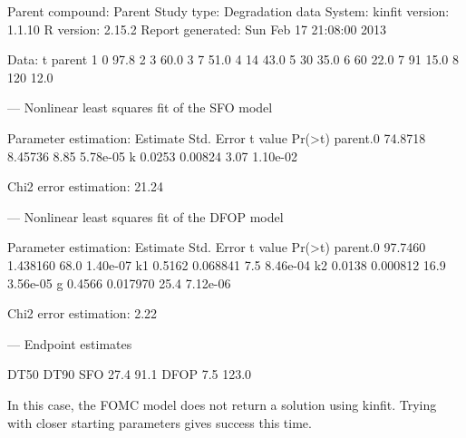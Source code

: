 \documentclass[12pt,a4paper]{article}
\begin{document}
\begin{Schunk}
\begin{Soutput}
Parent compound:  Parent 
Study type:       Degradation data 
System:            
kinfit version:   1.1.10 
R version:        2.15.2 
Report generated: Sun Feb 17 21:08:00 2013 

Data:
    t parent
1   0   97.8
2   3   60.0
3   7   51.0
4  14   43.0
5  30   35.0
6  60   22.0
7  91   15.0
8 120   12.0



---
Nonlinear least squares fit of the SFO model

Parameter estimation:	
         Estimate Std. Error t value   Pr(>t)
parent.0  74.8718    8.45736    8.85 5.78e-05
k          0.0253    0.00824    3.07 1.10e-02

Chi2 error estimation: 21.24 %



---
Nonlinear least squares fit of the DFOP model

Parameter estimation:	
         Estimate Std. Error t value   Pr(>t)
parent.0  97.7460   1.438160    68.0 1.40e-07
k1         0.5162   0.068841     7.5 8.46e-04
k2         0.0138   0.000812    16.9 3.56e-05
g          0.4566   0.017970    25.4 7.12e-06

Chi2 error estimation: 2.22 %



---
Endpoint estimates

     DT50  DT90
SFO  27.4  91.1
DFOP  7.5 123.0
\end{Soutput}
\end{Schunk}

In this case, the FOMC model does not return a solution using kinfit. Trying with 
closer starting parameters gives success this time.
\end{document}
